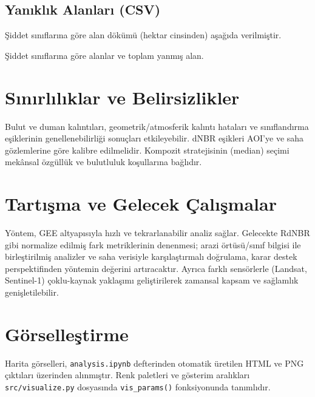 \documentclass[11pt,a4paper]{article}
\begin{document}
\subsection{Yanıklık Alanları (CSV)}
Şiddet sınıflarına göre alan dökümü (hektar cinsinden) aşağıda verilmiştir.
\begin{table}[H]
  \centering
  \caption{Şiddet sınıflarına göre alanlar ve toplam yanmış alan.}
\end{table}
\section{Sınırlılıklar ve Belirsizlikler}
Bulut ve duman kalıntıları, geometrik/atmosferik kalıntı hataları ve sınıflandırma
eşiklerinin genellenebilirliği sonuçları etkileyebilir. dNBR eşikleri AOI'ye ve saha
gözlemlerine göre kalibre edilmelidir. Kompozit stratejisinin (median) seçimi mekânsal
özgüllük ve bulutluluk koşullarına bağlıdır.

\section{Tartışma ve Gelecek Çalışmalar}
Yöntem, GEE altyapısıyla hızlı ve tekrarlanabilir analiz sağlar. Gelecekte RdNBR gibi
normalize edilmiş fark metriklerinin denenmesi; arazi örtüsü/sınıf bilgisi ile
birleştirilmiş analizler ve saha verisiyle karşılaştırmalı doğrulama, karar destek
perspektifinden yöntemin değerini artıracaktır. Ayrıca farklı sensörlerle (Landsat,\,Sentinel-1)
çoklu-kaynak yaklaşımı geliştirilerek zamansal kapsam ve sağlamlık genişletilebilir.

\section{Görselleştirme}
Harita görselleri, \texttt{analysis.ipynb} defterinden otomatik üretilen HTML ve PNG
çıktıları üzerinden alınmıştır. Renk paletleri ve gösterim aralıkları \texttt{src/visualize.py}
dosyasında \texttt{vis\_params()} fonksiyonunda tanımlıdır.
\end{document}
